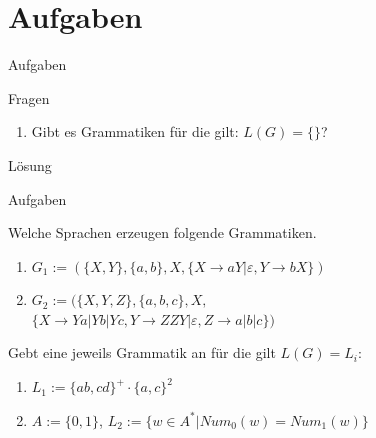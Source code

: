 	\section{Aufgaben}
	\begin{frame}{Aufgaben}
    	\begin{exampleblock}{Fragen}
        	\begin{enumerate}
          		\item Gibt es Grammatiken für die gilt: $L(G) = \{\}$?
          		
          		
          		
        	\end{enumerate}
    	\end{exampleblock}
    	
    	\begin{exampleblock}{Lösung}
        	\begin{enumerate}
        	\end{enumerate}
    	\end{exampleblock}
	\end{frame}

	
	\begin{frame}{Aufgaben}
  		\begin{exampleblock}{Welche Sprachen erzeugen folgende Grammatiken.}
    		\begin{enumerate}
      			\item $G_1 := (\{X, Y\}, \{a, b\}, X, \{X \rightarrow aY 
      			| \varepsilon, Y \rightarrow bX\})$
      			
      			\item $G_2 := (\{X, Y, Z\}, \{a, b, c\}, X,$\\
             	$\{X \rightarrow Ya | Yb | Yc, Y \rightarrow ZZY 
             	| \varepsilon, Z \rightarrow a | b | c\})$
    		\end{enumerate}
  		\end{exampleblock}
  		
  		\begin{exampleblock}
  			{Gebt eine jeweils Grammatik an für die gilt $L(G) = L_i$:}
        	\begin{enumerate}
      			\item $L_1 := \{ab, cd\}^+ \cdot \{a, c\}^2$
      			\item $A := \{0, 1\}$, $L_2 := \{w  \in A^*
      			| Num_0(w) = Num_1(w)\}$
    		\end{enumerate}
  		\end{exampleblock}
	\end{frame}


